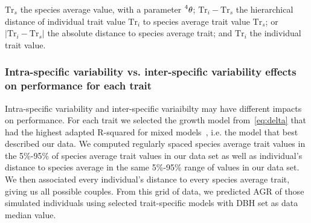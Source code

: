  $\text{Tr}_s$ the species average value, with a parameter $\prescript{4}{}\theta$; $\text{Tr}_i - \text{Tr}_s$ the hierarchical distance of individual trait value $\text{Tr}_i$ to species average trait value $\text{Tr}_s$; or $\vert \text{Tr}_i - \text{Tr}_s \vert$ the absolute distance to species average trait; and $\text{Tr}_i$ the individual trait value.
 
%
%

\subsubsection{Intra-specific variability vs. inter-specific variability effects on performance for each trait}

Intra-specific variability and inter-specific variaibilty may have different impacts on performance. For each trait we selected the growth model from~\autoref{eq:delta} that had the highest adapted R-squared for mixed models~\citep{nakagawa_general_2013}, i.e. the model that best described our data. 
We computed regularly spaced species average trait values in the 5\%-95\% of species average trait values in our data set as well as individual's distance to species average in the same 5\%-95\% range of values in our data set. We then associated every individual's distance to every species average trait, giving us all possible couples. From this grid of data, we predicted AGR of those simulated individuals using selected trait-specific models with DBH set as data median value.

